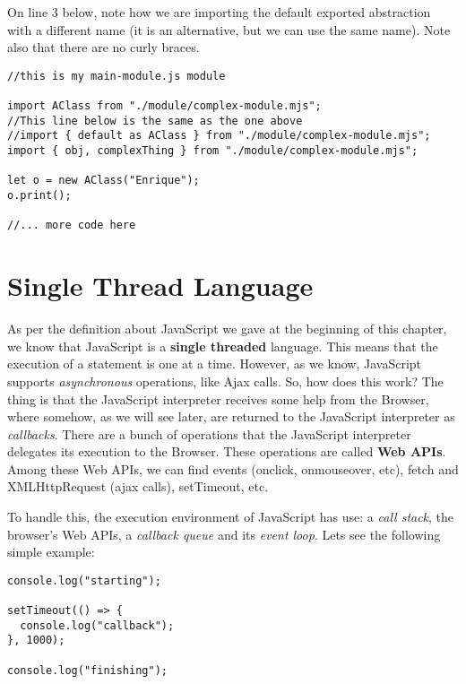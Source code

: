 \documentclass[a4paper, oneside, titlepage, 12pt]{book}
\begin{document}
On line 3 below, note how we are importing the default exported abstraction with a different name (it is an alternative, but we can use the same name). Note also that there are no curly braces.

\begin{verbatim}
//this is my main-module.js module

import AClass from "./module/complex-module.mjs";
//This line below is the same as the one above
//import { default as AClass } from "./module/complex-module.mjs";
import { obj, complexThing } from "./module/complex-module.mjs";

let o = new AClass("Enrique");
o.print();

//... more code here
\end{verbatim}


\section{Single Thread Language} \label{single_thread}

As per the definition about JavaScript we gave at the beginning of this chapter, we know that JavaScript is a \textbf{single threaded} language. This means that the execution of a statement is one at a time. However, as we know, JavaScript supports \textit{asynchronous} operations, like Ajax calls. So, how does this work? The thing is that the JavaScript interpreter receives some help from the Browser, where somehow, as we will see later, are returned to the JavaScript interpreter as \textit{callbacks}. There are a bunch of operations that the JavaScript interpreter delegates its execution to the Browser. These operations are called \textbf{Web APIs}. Among these Web APIs, we can find events (onclick, onmouseover, etc), fetch and XMLHttpRequest (ajax calls), setTimeout, etc.

To handle this, the execution environment of JavaScript has use: a \textit{call stack}, the browser's Web APIs, a \textit{callback queue} and its \textit{event loop}. Lets see the following simple example:

\begin{verbatim}
console.log("starting");

setTimeout(() => {
  console.log("callback");
}, 1000);

console.log("finishing");
\end{verbatim}
\end{document}

